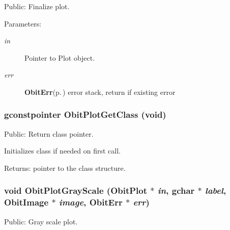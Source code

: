 Public: Finalize plot. 

\begin{Desc}
\item[Parameters:]
\begin{description}
\item[{\em in}]Pointer to Plot object. \item[{\em err}]{\bf Obit\-Err}{\rm (p.\,\pageref{structObitErr})} error stack, return if existing error \end{description}
\end{Desc}
\subsubsection{\setlength{\rightskip}{0pt plus 5cm}gconstpointer Obit\-Plot\-Get\-Class (void)}\label{ObitPlot_8c_a7}


Public: Return class pointer. 

Initializes class if needed on first call. \begin{Desc}
\item[Returns:]pointer to the class structure. \end{Desc}
\subsubsection{\setlength{\rightskip}{0pt plus 5cm}void Obit\-Plot\-Gray\-Scale ({\bf Obit\-Plot} $\ast$ {\em in}, gchar $\ast$ {\em label}, {\bf Obit\-Image} $\ast$ {\em image}, {\bf Obit\-Err} $\ast$ {\em err})}\label{ObitPlot_8c_a13}


Public: Gray scale plot. 

